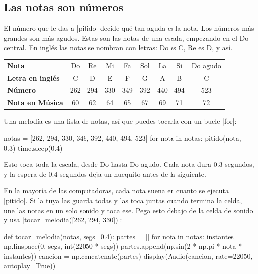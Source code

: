\subsection*{Las notas son números}

El número que le das a \py|pitido| decide qué tan aguda es la nota. Los números más grandes son más agudos. Estas son las notas de una escala, empezando en el Do central. En inglés las notas se nombran con letras: Do es C, Re es D, y así.

\begin{center}
\renewcommand{\arraystretch}{1.3}
\begin{tabular}{l*{8}{c}}
\toprule
\textbf{Nota} & Do & Re & Mi & Fa & Sol & La & Si & Do agudo \\
\textbf{Letra en inglés} & C & D & E & F & G & A & B & C \\
\textbf{Número} & 262 & 294 & 330 & 349 & 392 & 440 & 494 & 523 \\
\textbf{Nota en Música} & 60 & 62 & 64 & 65 & 67 & 69 & 71 & 72 \\
\bottomrule
\end{tabular}
\end{center}

Una melodía es una lista de notas, así que puedes tocarla con un bucle \py|for|:

\begin{code}
notas = [262, 294, 330, 349, 392, 440, 494, 523]
for nota in notas:
    pitido(nota, 0.3)
    time.sleep(0.4)
\end{code}

Esto toca toda la escala, desde Do hasta Do agudo. Cada nota dura 0.3 segundos, y la espera de 0.4 segundos deja un huequito antes de la siguiente.

\begin{think}
En la mayoría de las computadoras, cada nota suena en cuanto se ejecuta \py|pitido|. Si la tuya las guarda todas y las toca juntas cuando termina la celda, une las notas en un solo sonido y toca ese. Pega esto debajo de la celda de sonido y usa \py|tocar_melodia([262, 294, 330])|:
\begin{codenonum}
def tocar_melodia(notas, segs=0.4):
    partes = []
    for nota in notas:
        instantes = np.linspace(0, segs, int(22050 * segs))
        partes.append(np.sin(2 * np.pi * nota * instantes))
    cancion = np.concatenate(partes)
    display(Audio(cancion, rate=22050, autoplay=True))
\end{codenonum}
\end{think}

